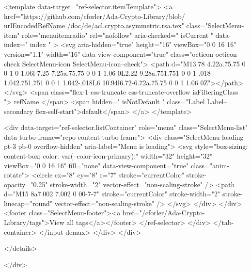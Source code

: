 <template data-target="ref-selector.itemTemplate">
  <a href="https://github.com/cforler/Ada-Crypto-Library/blob/{{ urlEncodedRefName }}/doc/de/acl.crypto.asymmetric.rsa.tex" class="SelectMenu-item" role="menuitemradio" rel="nofollow" aria-checked="{{ isCurrent }}" data-index="{{ index }}" >
    <svg aria-hidden="true" height="16" viewBox="0 0 16 16" version="1.1" width="16" data-view-component="true" class="octicon octicon-check SelectMenu-icon SelectMenu-icon--check">
    <path d="M13.78 4.22a.75.75 0 0 1 0 1.06l-7.25 7.25a.75.75 0 0 1-1.06 0L2.22 9.28a.751.751 0 0 1 .018-1.042.751.751 0 0 1 1.042-.018L6 10.94l6.72-6.72a.75.75 0 0 1 1.06 0Z"></path>
</svg>
    <span class="flex-1 css-truncate css-truncate-overflow {{ isFilteringClass }}">{{ refName }}</span>
    <span hidden="{{ isNotDefault }}" class="Label Label--secondary flex-self-start">default</span>
  </a>
</template>


            <div data-target="ref-selector.listContainer" role="menu" class="SelectMenu-list" data-turbo-frame="repo-content-turbo-frame">
              <div class="SelectMenu-loading pt-3 pb-0 overflow-hidden" aria-label="Menu is loading">
                <svg style="box-sizing: content-box; color: var(--color-icon-primary);" width="32" height="32" viewBox="0 0 16 16" fill="none" data-view-component="true" class="anim-rotate">
  <circle cx="8" cy="8" r="7" stroke="currentColor" stroke-opacity="0.25" stroke-width="2" vector-effect="non-scaling-stroke" />
  <path d="M15 8a7.002 7.002 0 00-7-7" stroke="currentColor" stroke-width="2" stroke-linecap="round" vector-effect="non-scaling-stroke" />
</svg>
              </div>
            </div>
              <footer class="SelectMenu-footer"><a href="/cforler/Ada-Crypto-Library/tags">View all tags</a></footer>
          </ref-selector>
        </div>
      </tab-container>
    </input-demux>
  </div>
</div>

  </details>

</div>


